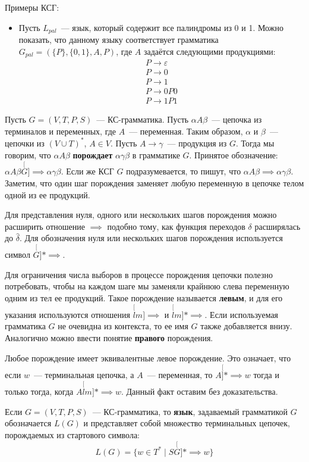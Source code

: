 \documentclass[a4paper,12pt]{article}
\begin{document}
	Примеры КСГ:
	\begin{itemize}
		\item Пусть $L_{pal}$~--- язык, который содержит все палиндромы из 0 и 1. Можно показать, что данному языку соответствует грамматика $G_{pal} = (\{P\}, \{0, 1\}, A, P)$, где $A$ задаётся следующими продукциями: 
		\[\begin{array}{c}
		P \to \varepsilon \\
		P \to 0 \\
		P \to 1 \\
		P \to 0P0 \\
		P \to 1P1
		\end{array}\]
	\end{itemize}
	
	Пусть $G = (V, T, P, S)$~--- КС-грамматика. Пусть $\alpha A \beta$~--- цепочка из терминалов и переменных, где $A$~--- переменная. Таким образом, $\alpha$ и $\beta$~--- цепочки из $(V \cup T)^*$, $A \in V$. Пусть $A \to \gamma$~--- продукция из $G$. Тогда мы говорим, что $\alpha A \beta$ \textbf{порождает} $\alpha \gamma \beta$ в грамматике $G$. Принятое обозначение: $\alpha A \beta \stackrel[G]{}{\implies} \alpha \gamma \beta$. Если же КСГ $G$ подразумевается, то пишут, что $\alpha A \beta \implies \alpha \gamma \beta$. Заметим, что один шаг порождения заменяет любую переменную в цепочке телом одной из ее продукций.
	
	Для представления нуля, одного или нескольких шагов порождения можно расширить отношение $\implies$ подобно тому, как функция переходов $\delta$ расширялась до $\hat{\delta}$. Для обозначения нуля или нескольких шагов порождения используется символ $\stackrel[G]{*}{\implies}$.
	
	Для ограничения числа выборов в процессе порождения цепочки полезно потребовать, чтобы на каждом шаге мы заменяли крайнюю слева переменную одним из тел ее продукций. Такое порождение называется \textbf{левым}, и для его указания используются отношения $\stackrel[lm]{}{\implies}$ и $\stackrel[lm]{*}{\implies}$. Если используемая грамматика $G$ не очевидна из контекста, то ее имя $G$ также добавляется внизу. Аналогично можно ввести понятие \textbf{правого} порождения.
	
	Любое порождение имеет эквивалентные левое  порождение. Это означает, что если $w$~--- терминальная цепочка, а $A$~--- переменная, то $A \stackrel[]{*}{\implies} w$ тогда и только тогда, когда $A \stackrel[lm]{*}{\implies} w$. Данный факт оставим без доказательства. 
	
	Если $G = (V, T, P, S)$~--- КС-грамматика, то \textbf{язык}, задаваемый грамматикой $G$  обозначается $L(G)$ и представляет собой множество терминальных цепочек, порождаемых из стартового символа: \[L(G) = \{w \in T^* \mid S \stackrel[G]{*}{\implies} w\}\]
	
\end{document}
